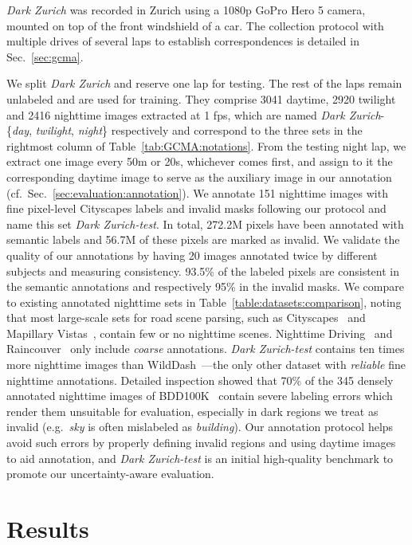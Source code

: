 \documentclass[10pt,twocolumn,letterpaper]{article}
\begin{document}
\emph{Dark Zurich} was recorded in Zurich using a 1080p GoPro Hero 5 camera, mounted on top of the front windshield of a car. The collection protocol with multiple drives of several laps to establish correspondences is detailed in Sec.~\ref{sec:gcma}.

We split \emph{Dark Zurich} and reserve one lap for testing. The rest of the laps remain unlabeled and are used for training. They comprise 3041 daytime, 2920 twilight and 2416 nighttime images extracted at 1 fps, which are named \emph{Dark Zurich}-\{\emph{day}, \emph{twilight}, \emph{night}\} respectively and correspond to the three sets in the rightmost column of Table~\ref{tab:GCMA:notations}. From the testing night lap, we extract one image every 50m or 20s, whichever comes first, and assign to it the corresponding daytime image to serve as the auxiliary image  in our annotation (cf.\ Sec.~\ref{sec:evaluation:annotation}). We annotate 151 nighttime images with fine pixel-level Cityscapes labels and invalid masks following our protocol and name this set \emph{Dark Zurich-test}. In total, 272.2M pixels have been annotated with semantic labels and 56.7M of these pixels are marked as invalid. We validate the quality of our annotations by having 20 images annotated twice by different subjects and measuring consistency. 93.5\% of the labeled pixels are consistent in the semantic annotations and respectively 95\% in the invalid masks.
We compare to existing annotated nighttime sets in Table~\ref{table:datasets:comparison}, noting that most large-scale sets for road scene parsing, such as Cityscapes~\cite{Cityscapes} and Mapillary Vistas~\cite{Mapillary}, contain few or no nighttime scenes. Nighttime Driving~\cite{daytime:2:nighttime} and Raincouver~\cite{raincouver} only include \emph{coarse} annotations. \emph{Dark Zurich-test} contains ten times more nighttime images than WildDash~\cite{wilddash}---the only other dataset with \emph{reliable} fine nighttime annotations. Detailed inspection showed that 70\% of the 345 densely annotated nighttime images of BDD100K~\cite{BDD100K} contain severe labeling errors which render them unsuitable for evaluation, especially in dark regions we treat as invalid (e.g.\ \emph{sky} is often mislabeled as \emph{building}). Our annotation protocol helps avoid such errors by properly defining invalid regions and using daytime images to aid annotation, and \emph{Dark Zurich-test} is an initial high-quality benchmark to promote our uncertainty-aware evaluation.


\section{Results}
\label{sec:exp}
\end{document}
